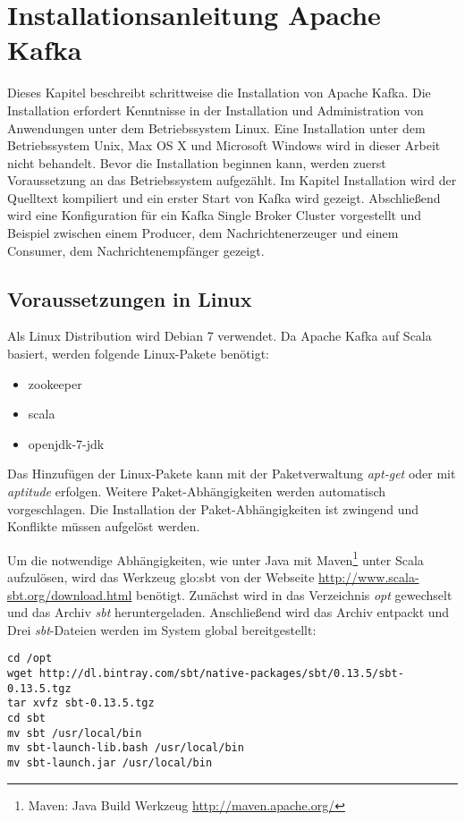 \section{Installationsanleitung Apache Kafka}
\label{section:kafkainstall}


Dieses Kapitel beschreibt schrittweise die Installation von Apache Kafka. Die Installation erfordert Kenntnisse in der Installation und Administration von Anwendungen unter dem Betriebssystem Linux. Eine Installation unter dem Betriebssystem Unix, Max OS X und Microsoft Windows wird in dieser Arbeit nicht behandelt. Bevor die Installation beginnen kann, werden zuerst Voraussetzung an das Betriebssystem aufgezählt. Im Kapitel Installation wird der Quelltext kompiliert und ein erster Start von Kafka wird gezeigt. Abschließend wird eine Konfiguration für ein Kafka Single Broker Cluster vorgestellt und Beispiel zwischen einem Producer, dem Nachrichtenerzeuger und einem Consumer, dem Nachrichtenempfänger gezeigt.


\subsection{Voraussetzungen in Linux}

Als Linux Distribution wird Debian 7 verwendet. Da Apache Kafka auf Scala basiert, werden folgende Linux-Pakete benötigt:

\begin{itemize}
	\item zookeeper
	\item scala
	\item openjdk-7-jdk	
\end{itemize}

Das Hinzufügen der Linux-Pakete kann mit der Paketverwaltung \textit{apt-get} oder mit \textit{aptitude} erfolgen. Weitere Paket-Abhängigkeiten werden automatisch vorgeschlagen. Die Installation der Paket-Abhängigkeiten ist zwingend und Konflikte müssen aufgelöst werden.  

Um die notwendige Abhängigkeiten, wie unter Java mit Maven\footnote{Maven: Java Build Werkzeug \url{http://maven.apache.org/}} unter Scala aufzulösen, wird das Werkzeug \gls{glo:sbt} von der Webseite \url{http://www.scala-sbt.org/download.html} benötigt. Zunächst wird in das Verzeichnis \textit{opt} gewechselt und das Archiv \textit{sbt} heruntergeladen. Anschließend wird das Archiv entpackt und Drei \textit{sbt}-Dateien werden im System global bereitgestellt:

\begin{verbatim}
cd /opt
wget http://dl.bintray.com/sbt/native-packages/sbt/0.13.5/sbt-0.13.5.tgz
tar xvfz sbt-0.13.5.tgz
cd sbt
mv sbt /usr/local/bin
mv sbt-launch-lib.bash /usr/local/bin
mv sbt-launch.jar /usr/local/bin
\end{verbatim}

